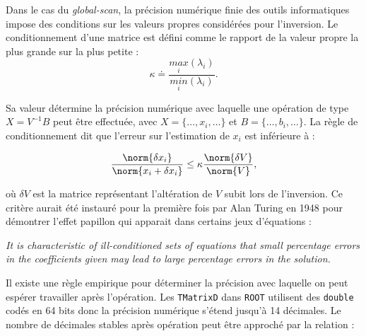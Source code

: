 \bigbreak

Dans le cas du \textit{global-scan}, la précision numérique finie des outils informatiques impose des conditions sur les valeurs propres considérées pour l'inversion. Le conditionnement d'une matrice est défini comme le rapport de la valeur propre la plus grande sur la plus petite :\\

\begin{equation}
    \kappa \doteq \frac{\underset{i}{max}\left( \lambda_i \right)}{\underset{i}{min}\left( \lambda_i \right)}.
\end{equation}

\bigbreak

Sa valeur détermine la précision numérique avec laquelle une opération de type $X = V^{-1}B$ peut être effectuée, avec  $X = \{ \hdots , x_i , \hdots\}$ et $B = \{ \hdots , b_i , \hdots \}$. La règle de conditionnement dit que l'erreur sur l'estimation de $x_i$ est inférieure à :

\begin{equation}
    \frac{\norm{\delta x_i}}{\norm{x_i + \delta x_i}} \leq \kappa \frac{\norm{\delta V}}{\norm{V}},
\end{equation}

\bigbreak

où $\delta V$ est la matrice représentant l'altération de $V$ subit lors de l'inversion. Ce critère aurait été instauré pour la première fois par Alan Turing en 1948 pour démontrer l'effet papillon qui apparait dans certains jeux d'équations \cite{10.1093/qjmam/1.1.287} :

\begin{center}
\begin{minipage}{0.75\textwidth}
\textit{ \hspace*{5mm} \og It is characteristic of ill-conditioned sets of equations that small percentage errors in the coefficients given may lead to large percentage errors in the solution. \fg{}}
\end{minipage}
\end{center}

\bigbreak

Il existe une règle empirique pour déterminer la précision avec laquelle on peut espérer travailler après l'opération. Les \texttt{TMatrixD} dans \texttt{ROOT} utilisent des \texttt{double} codés en 64 bits donc la précision numérique s'étend jusqu'à 14 décimales. Le nombre de décimales \og stables \fg{} après opération peut être approché par la relation :

